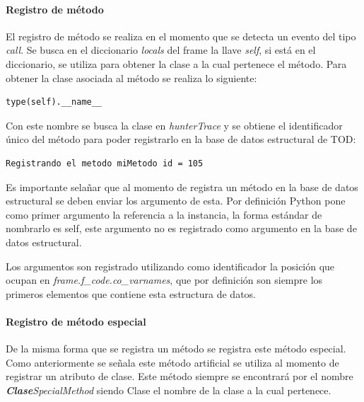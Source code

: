 \documentclass[12pt,legalpaper]{report}
\begin{document}
				\paragraph{Registro de método}

El registro de método se realiza en el momento que se detecta un evento del tipo \textit{call}.  Se busca en el diccionario \textit{locals} del frame la llave \textit{self}, si está en el diccionario, se utiliza para obtener la clase a la cual pertenece el método.  Para obtener la clase asociada al método se realiza lo siguiente:

\begin{singlespace}
\begin{lstlisting}[style=consola,numbers=none]
type(self).__name__
\end{lstlisting}
\end{singlespace}


Con este nombre se busca la clase en \textit{hunterTrace} y se obtiene el identificador único del método para poder registrarlo en la base de datos estructural de TOD:

\begin{singlespace}
\begin{lstlisting}[style=consola,numbers=none]
Registrando el metodo miMetodo id = 105
\end{lstlisting}
\end{singlespace}

Es importante selañar que al momento de registra un método en la base de datos estructural se deben enviar los argumento de esta.  Por definición Python pone como primer argumento la referencia a la instancia, la forma estándar de nombrarlo es self, este argumento no es registrado como argumento en la base de datos estructural.

Los argumentos son registrado utilizando como identificador la posición que ocupan en \textit{frame.f\_code.co\_varnames}, que por definición son siempre los primeros elementos que contiene esta estructura de datos.

				\paragraph{Registro de método especial}

De la misma forma que se registra un método se registra este método especial.  Como anteriormente se señala este método artificial se utiliza al momento de registrar un atributo de clase.  Este método siempre se encontrará por el nombre \textit{\textbf{Clase}SpecialMethod} siendo Clase el nombre de la clase a la cual pertenece.
\end{document}
